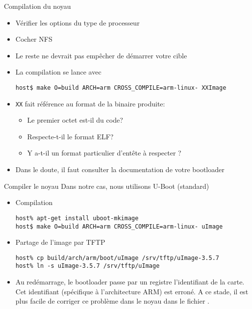 \begin{frame}[fragile=singleslide]{Compilation du noyau}
  \begin{itemize}
  \item Vérifier les options du type de processeur
  \item Cocher NFS
  \item Le reste ne devrait pas empêcher de démarrer votre cible
  \item La compilation se lance avec
    \begin{lstlisting}
host$ make O=build ARCH=arm CROSS_COMPILE=arm-linux- XXImage
    \end{lstlisting}
  \item \verb+XX+ fait référence au format de la binaire produite:
    \begin{itemize}
    \item Le premier octet est-il du code?
    \item Respecte-t-il le format ELF?
    \item Y a-t-il un format particulier d'entête à respecter ?
    \end{itemize}
  \item Dans  le doute,  il faut consulter  la documentation  de votre
    bootloader
  \end{itemize}
\end{frame}  

\begin{frame}[fragile=singleslide]{Compiler le noyau}
  Dans notre cas, nous utilisons U-Boot (standard)
  \begin{itemize}
  \item Compilation
    \begin{lstlisting}
host% apt-get install uboot-mkimage
host$ make O=build ARCH=arm CROSS_COMPILE=arm-linux- uImage
    \end{lstlisting}
  \item Partage de l'image par TFTP
    \begin{lstlisting}
host% cp build/arch/arm/boot/uImage /srv/tftp/uImage-3.5.7
host% ln -s uImage-3.5.7 /srv/tftp/uImage
    \end{lstlisting} %
  \item  Au   redémarrage,  le   bootloader  passe  par   un  registre
    l'identifiant  de   la  carte.   Cet   identifiant  (spécifique  à
    l'architecture ARM) est erroné. A  ce stade, il est plus facile de
    corriger   ce   problème   dans   le   noyau   dans   le   fichier
    .
  \end{itemize}
\end{frame}

